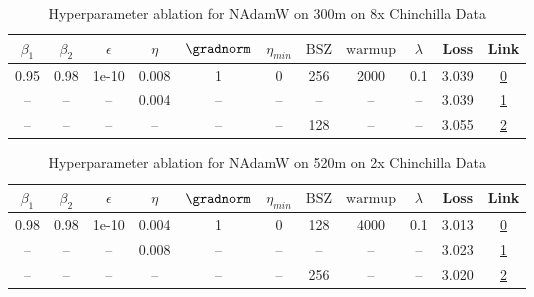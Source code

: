 \begin{table}[H]
\centering
\caption{Hyperparameter ablation for NAdamW on 300m on 8x Chinchilla Data}
\label{tab:ablation_nadamw_300m_on_8x_chinchilla_data}
\begin{tabular}{ccccccccccc}
\toprule
$\beta_1$ & $\beta_2$ & $\epsilon$ & $\eta$ & $\gradnorm$ & $\eta_{min}$ & $\mathrm{BSZ}$ & $\mathrm{warmup}$ & $\lambda$ & Loss & Link \\
\midrule
0.95 & 0.98 & 1e-10 & 0.008 & 1 & 0 & 256 & 2000 & 0.1 & 3.039 & \href{https://wandb.ai/stanford-mercury/optimizer-scaling/runs/sweep-300m-48B-nadamw506173lr0.008-wd0.1-minlr0-warmup2000-b10.9-a344a3}{0} \\
\midrule
-- & -- & -- & 0.004 & -- & -- & -- & -- & -- & 3.039 & \href{https://wandb.ai/stanford-mercury/optimizer-scaling/runs/sweep-300m-48B-nadamw511d7blr0.004-wd0.1-minlr0-warmup2000-b10.9-9099f5}{1} \\
-- & -- & -- & -- & -- & -- & 128 & -- & -- & 3.055 & \href{https://wandb.ai/stanford-mercury/optimizer-scaling/runs/sweep-300m-48B-nadamwfd0717lr0.008-wd0.1-minlr0-warmup2000-b10.9-5665cf}{2} \\
\bottomrule
\end{tabular}
\end{table}

\begin{table}[H]
\centering
\caption{Hyperparameter ablation for NAdamW on 520m on 2x Chinchilla Data}
\label{tab:ablation_nadamw_520m_on_2x_chinchilla_data}
\begin{tabular}{ccccccccccc}
\toprule
$\beta_1$ & $\beta_2$ & $\epsilon$ & $\eta$ & $\gradnorm$ & $\eta_{min}$ & $\mathrm{BSZ}$ & $\mathrm{warmup}$ & $\lambda$ & Loss & Link \\
\midrule
0.98 & 0.98 & 1e-10 & 0.004 & 1 & 0 & 128 & 4000 & 0.1 & 3.013 & \href{https://wandb.ai/stanford-mercury/optimizer-scaling/runs/sweep-520m-21B-nadamw0a1fe6lr0.004-wd0.1-minlr0-warmup4000-b10.9-2d3f42}{0} \\
\midrule
-- & -- & -- & 0.008 & -- & -- & -- & -- & -- & 3.023 & \href{https://wandb.ai/stanford-mercury/optimizer-scaling/runs/sweep-520m-21B-nadamw999646lr0.008-wd0.1-minlr0-warmup4000-b10.9-e42d78}{1} \\
-- & -- & -- & -- & -- & -- & 256 & -- & -- & 3.020 & \href{https://wandb.ai/stanford-mercury/optimizer-scaling/runs/sweep-520m-21B-nadamw98f1d8lr0.004-wd0.1-minlr0-warmup4000-b10.9-727fdb}{2} \\
\bottomrule
\end{tabular}
\end{table}

